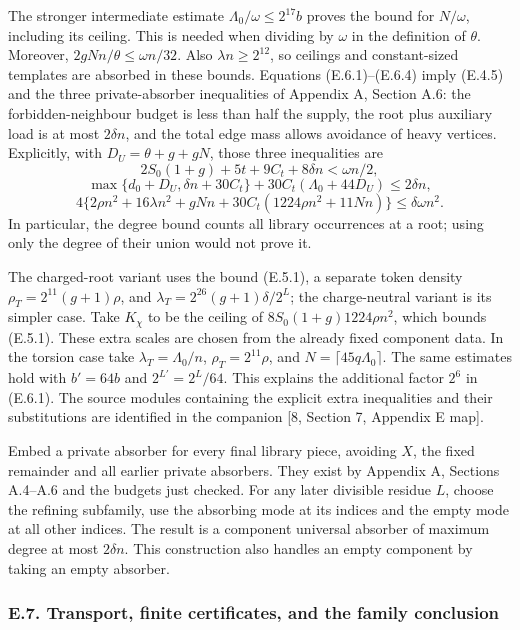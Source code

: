 \documentclass[english,11pt,a4paper]{article}
\begin{document}
The stronger intermediate estimate \(\Lambda_0/\omega\le2^{17}b\) proves the bound for \(N/\omega\), including its ceiling. This is needed when dividing by \(\omega\) in the definition of \(\theta\). Moreover, \(2gNn/\theta\le\omega n/32\). Also \(\lambda n\ge2^{12}\), so ceilings and constant-sized templates are absorbed in these bounds. Equations (E.6.1)--(E.6.4) imply (E.4.5) and the three private-absorber inequalities of Appendix A, Section A.6: the forbidden-neighbour budget is less than half the supply, the root plus auxiliary load is at most \(2\delta n\), and the total edge mass allows avoidance of heavy vertices. Explicitly, with \(D_U=\theta+g+gN\), those three inequalities are \[2S_0(1+g)+5t+9C_t+8\delta n<\omega n/2,\] \[\max\{d_0+D_U,\delta n+30C_t\}
+30C_t(\Lambda_0+44D_U)\le2\delta n,\] \[4\{2\rho n^2+16\lambda n^2+gNn
+30C_t(1224\rho n^2+11Nn)\}\le\delta\omega n^2.
\tag{E.6.5}\] In particular, the degree bound counts all library occurrences at a root; using only the degree of their union would not prove it.

The charged-root variant uses the bound (E.5.1), a separate token density \(\rho_T=2^{11}(g+1)\rho\), and \(\lambda_T=2^{26}(g+1)\delta/2^L\); the charge-neutral variant is its simpler case. Take \(K_\chi\) to be the ceiling of \(8S_0(1+g)1224\rho n^2\), which bounds (E.5.1). These extra scales are chosen from the already fixed component data. In the torsion case take \(\lambda_T=\Lambda_0/n\), \(\rho_T=2^{11}\rho\), and \(N=\lceil45q\Lambda_0\rceil\). The same estimates hold with \(b'=64b\) and \(2^{L'}=2^L/64\). This explains the additional factor \(2^6\) in (E.6.1). The source modules containing the explicit extra inequalities and their substitutions are identified in the companion {[}8, Section 7, Appendix E map{]}.

Embed a private absorber for every final library piece, avoiding \(X\), the fixed remainder and all earlier private absorbers. They exist by Appendix A, Sections A.4--A.6 and the budgets just checked. For any later divisible residue \(L\), choose the refining subfamily, use the absorbing mode at its indices and the empty mode at all other indices. The result is a component universal absorber of maximum degree at most \(2\delta n\). This construction also handles an empty component by taking an empty absorber.

\subsubsection{E.7. Transport, finite certificates, and the family conclusion}\label{e.7.-transport-finite-certificates-and-the-family-conclusion}
\end{document}
